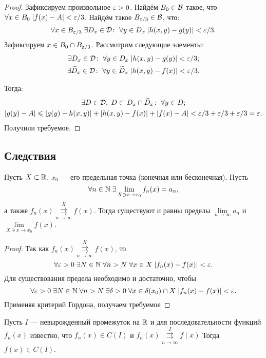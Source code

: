 \documentclass[a4paper, 12pt]{article}
\begin{document}
\begin{proof}
    Зафиксируем произвольное $\varepsilon > 0$. Найдём  $B_0 \in \mathcal{B}$ такое, что $\forall x\in B_0\; |f(x) - A| < \varepsilon/3$. Найдём такое $B_{\varepsilon/3} \in \mathcal{B}$, что: 
    $$
        \forall x\in B_{\varepsilon/3}\; \exists D_x\in \mathcal{D}\colon \; \forall y\in D_x\; |h(x,y) - g(y)| < \varepsilon/3.
    $$
    Зафиксируем $x\in B_0\cap B_{\varepsilon/3}$. Рассмотрим следующие элементы:
    \begin{gather}
        \exists D_x \in \mathcal{D}\colon\;\forall y\in D_x \; |h(x,y) - g(y)| <\varepsilon/3;\\
        \exists \widetilde{D}_x\in \mathcal{D}\colon \; \forall y\in \widetilde{D}_x\; |h(x,y) - f(x)| < \varepsilon/3.
    \end{gather}
    
    Тогда:    
    \begin{gather}
        \exists D\in \mathcal{D},\; D \subset D_x \cap \widetilde{D}_x\colon \; \forall y\in D;\\
        |g(y) - A| \leqslant |g(y) - h(x,y)| + |h(x,y) - f(x)| + |f(x) - A| < \varepsilon/3 + \varepsilon/3 + \varepsilon/3 = \varepsilon.
    \end{gather}
    Получили требуемое.
\end{proof}

\subsection{Следствия}

\begin{Theorem}
    Пусть $X\subset \mathbb{R}$, $x_0$ --- его предельная точка (конечная или бесконечная). Пусть 
    $$
        \forall n \in \mathbb{N}\; \exists \lim\limits_{X\owns x \to x_0} f_n(x) = a_n,
    $$
    а также $f_n(x)\overset{X}{\underset{n\to\infty}{\rightrightarrows}} f(x)$. Тогда  существуют и равны пределы $\lim\limits_{n \to \infty}a_n$ и $\lim\limits_{X \owns x\to x_0} f(x)$.
\end{Theorem}
\begin{proof}
    Так как $f_n(x)\overset{X}{\underset{n\to\infty}{\rightrightarrows}} f(x)$, то
    $$
        \forall \varepsilon >0\; \exists N\in \mathbb{N}\; \forall n>N\; \forall x \in X\; |f_n(x) - f(x)| < \varepsilon.
    $$
    Для существования предела необходимо и достаточно, чтобы
    $$
        \forall \varepsilon > 0\; \exists N \in \mathbb{N}\; \forall n>N\; \exists \delta >0\; \forall x\in \delta(x_0)\cap X\; |f_n(x) - f(x)| < \varepsilon.
    $$
    Применяя критерий Гордона, получаем требуемое
\end{proof}
\begin{Consequence}
    Пусть $I$ --- невырожденный промежуток на $\mathbb{R}$ и для последовательности функций $f_n(x)$ известно, что $f_n(x) \in C(I)$ и $f_n(x)\overset{I}{\underset{n\to\infty}{\rightrightarrows}} f(x)$
    Тогда $f(x) \in C(I)$.
\end{Consequence}
\end{document}
